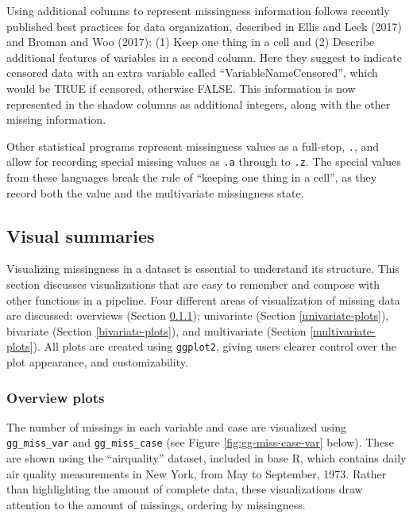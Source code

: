 \documentclass[]{article}
\theoremstyle{definition}
\theoremstyle{definition}
\theoremstyle{definition}
\theoremstyle{remark}
\begin{document}
Using additional columns to represent missingness information follows
recently published best practices for data organization, described in
Ellis and Leek (2017) and Broman and Woo (2017): (1) Keep one thing in a
cell and (2) Describe additional features of variables in a second
column. Here they suggest to indicate censored data with an extra
variable called ``VariableNameCensored'', which would be TRUE if
censored, otherwise FALSE. This information is now represented in the
shadow columns as additional integers, along with the other missing
information.

Other statistical programs represent missingness values as a full-stop,
\texttt{.}, and allow for recording special missing values as
\texttt{.a} through to \texttt{.z}. The special values from these
languages break the rule of ``keeping one thing in a cell'', as they
record both the value and the multivariate missingness state.

\hypertarget{vis-summaries}{%
\subsection{Visual summaries}\label{vis-summaries}}

Visualizing missingness in a dataset is essential to understand its
structure. This section discusses visualizations that are easy to
remember and compose with other functions in a pipeline. Four different
areas of visualization of missing data are discussed: overviews (Section
\ref{overview-plots}); univariate (Section \ref{univariate-plots}),
bivariate (Section \ref{bivariate-plots}), and multivariate (Section
\ref{multivariate-plots}). All plots are created using \texttt{ggplot2},
giving users clearer control over the plot appearance, and
customizability.

\hypertarget{overview-plots}{%
\subsubsection{Overview plots}\label{overview-plots}}

The number of missings in each variable and case are visualized using
\texttt{gg\_miss\_var} and \texttt{gg\_miss\_case} (see Figure
\ref{fig:gg-miss-case-var} below). These are shown using the
``airquality'' dataset, included in base R, which contains daily air
quality measurements in New York, from May to September, 1973. Rather
than highlighting the amount of complete data, these visualizations draw
attention to the amount of missings, ordering by missingness.
\end{document}
